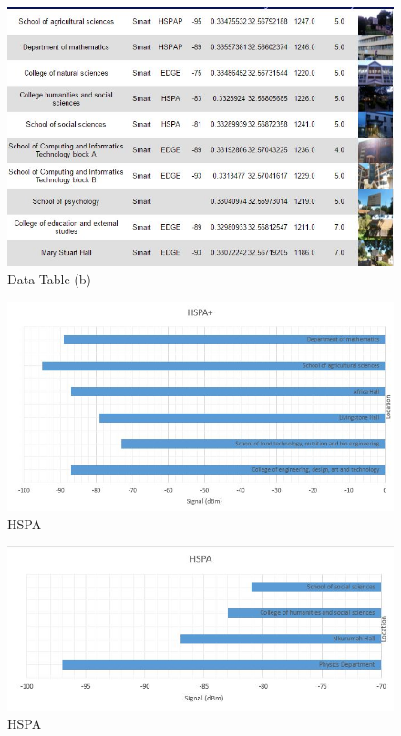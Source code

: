 \documentclass{article}
\begin{document}
\begin{figure}
  \includegraphics[width=\linewidth]{tabletwo.jpg}
  \caption{Data Table (b)}
  \label{fig:dt2}
\end{figure}

\begin{figure}
  \includegraphics[width=\linewidth]{hspap.jpg}
  \caption{HSPA+}
  \label{fig:hspap}
\end{figure}

\begin{figure}
  \includegraphics[width=\linewidth]{hspa.jpg}
  \caption{HSPA}
  \label{fig:hspa}
\end{figure}
\end{document}
